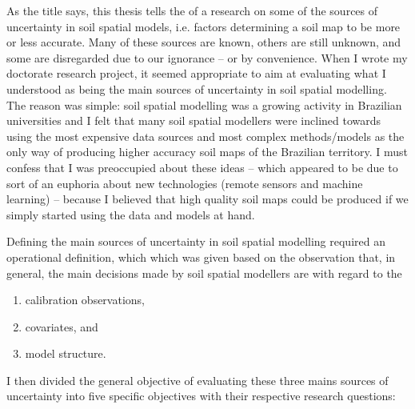 As the title says, this thesis tells the  of a research on some of the sources of uncertainty in soil 
spatial models, i.e. factors determining a soil map to be more or less accurate. Many of these sources are 
known, others are still unknown, and some are disregarded due to our ignorance -- or by convenience. When I 
wrote my doctorate research project, it seemed appropriate to aim at evaluating what I understood as being the 
main sources of uncertainty in soil spatial modelling. The reason was simple: soil spatial modelling was a 
growing activity in Brazilian universities and I felt that many soil spatial modellers were inclined towards 
using the most expensive data sources and most complex methods/models as the only way of producing higher 
accuracy soil maps of the Brazilian territory. I must confess that I was preoccupied about these ideas -- which 
appeared to be due to sort of an euphoria about new technologies (remote sensors and machine learning) -- 
because I believed that high quality soil maps could be produced if we simply started using the data and 
models at hand.

Defining the main sources of uncertainty in soil spatial modelling required an operational definition, which 
which was given based on the observation that, in general, the main decisions made by soil spatial modellers 
are with regard to the

\begin{enumerate}[label=(\alph*)]
 \item calibration observations,
 \item covariates, and
 \item model structure.
\end{enumerate}

I then divided the general objective of evaluating these three mains sources of uncertainty into five specific 
objectives with their respective research questions:

